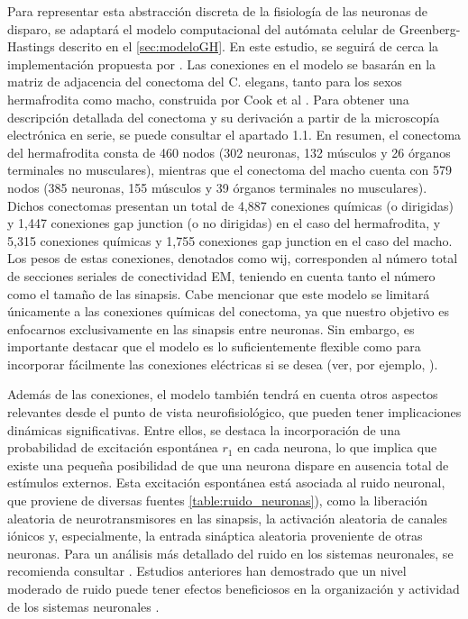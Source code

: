 Para representar esta abstracción discreta de la fisiología de las neuronas de disparo, se adaptará el modelo computacional del autómata celular de Greenberg-Hastings descrito en el \cref{sec:modeloGH}. En este estudio, se seguirá de cerca la implementación propuesta por \cite{haimovici_brain_2013}.  Las conexiones en el modelo se basarán en la matriz de adjacencia del conectoma del C. elegans, tanto para los sexos hermafrodita como macho, construida por Cook et al \cite{cook_whole-animal_2019}. Para obtener una descripción detallada del conectoma y su derivación a partir de la microscopía electrónica en serie, se puede consultar el apartado 1.1. En resumen, el conectoma del hermafrodita consta de 460 nodos (302 neuronas, 132 músculos y 26 órganos terminales no musculares), mientras que el conectoma del macho cuenta con 579 nodos (385 neuronas, 155 músculos y 39 órganos terminales no musculares). Dichos conectomas presentan un total de 4,887 conexiones químicas (o dirigidas) y 1,447 conexiones gap junction (o no dirigidas) en el caso del hermafrodita, y 5,315 conexiones químicas y 1,755 conexiones gap junction en el caso del macho. Los pesos de estas conexiones, denotados como wij, corresponden al número total de secciones seriales de conectividad EM, teniendo en cuenta tanto el número como el tamaño de las sinapsis. Cabe mencionar que este modelo se limitará únicamente a las conexiones químicas del conectoma, ya que nuestro objetivo es enfocarnos exclusivamente en las sinapsis entre neuronas. Sin embargo, es importante destacar que el modelo es lo suficientemente flexible como para incorporar fácilmente las conexiones eléctricas si se desea (ver, por ejemplo, \cite{protachevicz_how_2018}).

Además de las conexiones, el modelo también tendrá en cuenta otros aspectos relevantes desde el punto de vista neurofisiológico, que pueden tener implicaciones dinámicas significativas.  Entre ellos, se destaca la incorporación de una probabilidad de excitación espontánea $r_1$ en cada neurona, lo que implica que existe una pequeña posibilidad de que una neurona dispare en ausencia total de estímulos externos. Esta excitación espontánea está asociada al ruido neuronal, que proviene de diversas fuentes \cref{table:ruido_neuronas}), como la liberación aleatoria de neurotransmisores en las sinapsis, la activación aleatoria de canales iónicos y, especialmente, la entrada sináptica aleatoria proveniente de otras neuronas.  Para un análisis más detallado del ruido en los sistemas neuronales, se recomienda consultar \cite{faisal_noise_2008,destexhe_neuronal_2012}.  Estudios anteriores han demostrado que un nivel moderado de ruido puede tener efectos beneficiosos en la organización y actividad de los sistemas neuronales \cite{lindner_effects_2004,gosak_spatial_2007,vigelius_stochastic_2012}.

